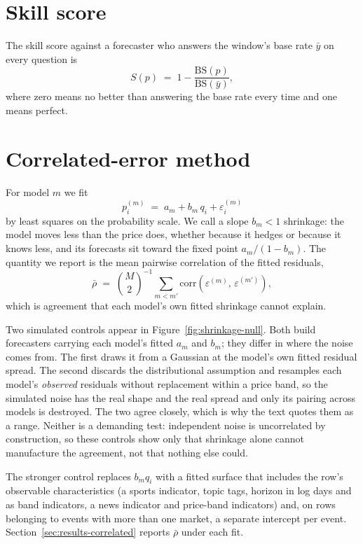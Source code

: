 \section{Skill score}
\label{app:skill}
The skill score against a forecaster who answers the window's base rate
$\bar{y}$ on every question is
\begin{equation}
S(p) \;=\; 1 - \frac{\mathrm{BS}(p)}{\mathrm{BS}(\bar{y})},
\label{eq:skill}
\end{equation}
where zero means no better than answering the base rate every time and one means
perfect.

\section{Correlated-error method}
\label{app:correlmethod}
For model $m$ we fit
\begin{equation}
p_i^{(m)} \;=\; a_m + b_m\,q_i + \varepsilon_i^{(m)}
\label{eq:shrinkage}
\end{equation}
by least squares on the probability scale. We call a slope $b_m<1$ shrinkage:
the model moves less than the price does, whether because it hedges or because it
knows less, and its forecasts sit toward the fixed point $a_m/(1-b_m)$. The quantity we report is the mean pairwise
correlation of the fitted residuals,
\begin{equation}
\bar{\rho} \;=\; \binom{M}{2}^{-1} \sum_{m < m'}
  \mathrm{corr}\!\left(\varepsilon^{(m)},\, \varepsilon^{(m')}\right),
\label{eq:residcorr}
\end{equation}
which is agreement that each model's own fitted shrinkage cannot explain.

Two simulated controls appear in Figure~\ref{fig:shrinkage-null}. Both build
forecasters carrying each model's fitted $a_m$ and $b_m$; they differ in where
the noise comes from. The first draws it from a Gaussian at the model's own
fitted residual spread. The second discards the distributional assumption and
resamples each model's \emph{observed} residuals without replacement within a
price band, so the simulated noise has the real shape and the real spread and
only its pairing across models is destroyed. The two agree closely, which is why
the text quotes them as a range. Neither is a demanding test: independent noise
is uncorrelated by construction, so these controls show only that shrinkage
alone cannot manufacture the agreement, not that nothing else could.

The stronger control replaces $b_m q_i$ with a fitted surface that includes the
row's observable characteristics (a sports indicator, topic tags, horizon in
log days and as band indicators, a news indicator and price-band
indicators) and, on rows belonging to events with more than one market, a
separate intercept per event. Section~\ref{sec:results-correlated} reports
$\bar{\rho}$ under each fit.

